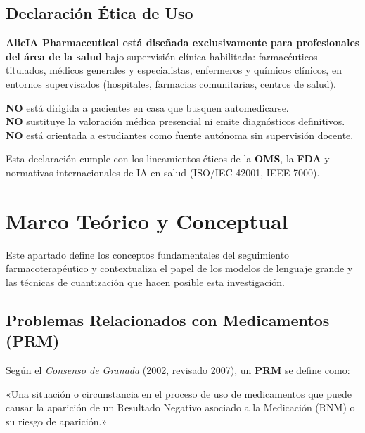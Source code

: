 \documentclass[12pt,a4paper]{article}
\begin{document}
\subsection{Declaración Ética de Uso}

\begin{dangerbox}
  \textbf{AlicIA Pharmaceutical está diseñada exclusivamente para profesionales del área de la
  salud} bajo supervisión clínica habilitada: farmacéuticos titulados, médicos generales y
  especialistas, enfermeros y químicos clínicos, en entornos supervisados (hospitales, farmacias
  comunitarias, centros de salud).

  \medskip
  \textbf{NO} está dirigida a pacientes en casa que busquen automedicarse.\\
  \textbf{NO} sustituye la valoración médica presencial ni emite diagnósticos definitivos.\\
  \textbf{NO} está orientada a estudiantes como fuente autónoma sin supervisión docente.

  \medskip
  Esta declaración cumple con los lineamientos éticos de la \textbf{OMS}, la \textbf{FDA} y
  normativas internacionales de IA en salud (ISO/IEC 42001, IEEE 7000).
\end{dangerbox}

\newpage

\section{Marco Teórico y Conceptual}

Este apartado define los conceptos fundamentales del seguimiento farmacoterapéutico y contextualiza el papel de los modelos de lenguaje grande y las técnicas de cuantización que hacen posible esta investigación.

\subsection{Problemas Relacionados con Medicamentos (PRM)}

Según el \textit{Consenso de Granada} (2002, revisado 2007), un \textbf{PRM} se define como:

\begin{infobox}
  «Una situación o circunstancia en el proceso de uso de medicamentos que puede causar la
  aparición de un Resultado Negativo asociado a la Medicación (RNM) o su riesgo de aparición.»
\end{infobox}
\end{document}
